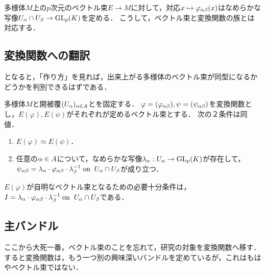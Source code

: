 \documentclass[uplatex,dvipdfmx]{jsreport}
\begin{document}
\begin{remarks}
    多様体$M$上の$p$次元のベクトル束$E\to M$に対して，対応$x\mapsto\varphi_{\alpha\beta}(x)$はなめらかな写像$U_\alpha\cap U_\beta\to\mathrm{GL}_p(K)$を定める．
    こうして，ベクトル束と変換関数の族とは対応する．
\end{remarks}

\subsection{変換関数への翻訳}

\begin{tcolorbox}[colframe=ForestGreen, colback=ForestGreen!10!white,breakable,colbacktitle=ForestGreen!40!white,coltitle=black,fonttitle=\bfseries\sffamily,
title=]
    となると，「作り方」を見れば，出来上がる多様体のベクトル束が同型になるかどうかを判別できるはずである．
\end{tcolorbox}

\begin{theorem}
    多様体$M$と開被覆$(U_\alpha)_{\alpha\in A}$とを固定する．
    $\varphi=(\varphi_{\alpha\beta}),\psi=(\psi_{\alpha\beta})$を変換関数とし，$E(\varphi),E(\psi)$がそれぞれが定めるベクトル束とする．
    次の２条件は同値．
    \begin{enumerate}
        \item $E(\varphi)\simeq E(\psi)$．
        \item 任意の$\alpha\in A$について，なめらかな写像$\lambda_\alpha:U_\alpha\to\mathrm{GL}_p(K)$が存在して，$\psi_{\alpha\beta}=\lambda_\alpha\cdot\varphi_{\alpha\beta}\cdot\lambda_\beta^{-1}\;\mathrm{on}\;\; U_\alpha\cap U_\beta$が成り立つ．
    \end{enumerate}
\end{theorem}
\begin{corollary}
    $E(\varphi)$が自明なベクトル束となるための必要十分条件は，
    $I=\lambda_\alpha\cdot\varphi_{\alpha\beta}\cdot\lambda_\beta^{-1}\;\mathrm{on}\;\;U_\alpha\cap U_\beta$である．
\end{corollary}

\subsection{主バンドル}

\begin{tcolorbox}[colframe=ForestGreen, colback=ForestGreen!10!white,breakable,colbacktitle=ForestGreen!40!white,coltitle=black,fonttitle=\bfseries\sffamily,
title=]
    ここから大死一番，ベクトル束のことを忘れて，研究の対象を変換関数へ移す．
    すると変換関数は，もう一つ別の興味深いバンドルを定めているが，これはもはやベクトル束ではない．
\end{tcolorbox}
\end{document}
